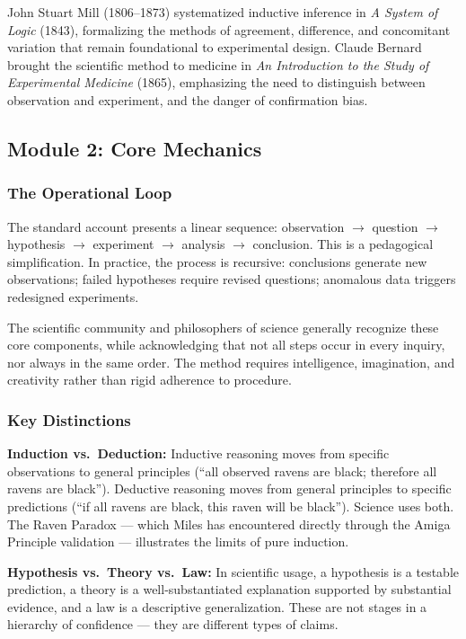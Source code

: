 \documentclass[11pt,letterpaper]{article}
\begin{document}
John Stuart Mill (1806--1873) systematized inductive inference in \emph{A System of Logic} (1843), formalizing the methods of agreement, difference, and concomitant variation that remain foundational to experimental design. Claude Bernard brought the scientific method to medicine in \emph{An Introduction to the Study of Experimental Medicine} (1865), emphasizing the need to distinguish between observation and experiment, and the danger of confirmation bias.

\subsection{Module 2: Core Mechanics}

\subsubsection{The Operational Loop}

The standard account presents a linear sequence: observation $\to$ question $\to$ hypothesis $\to$ experiment $\to$ analysis $\to$ conclusion. This is a pedagogical simplification. In practice, the process is recursive: conclusions generate new observations; failed hypotheses require revised questions; anomalous data triggers redesigned experiments.

The scientific community and philosophers of science generally recognize these core components, while acknowledging that not all steps occur in every inquiry, nor always in the same order. The method requires intelligence, imagination, and creativity rather than rigid adherence to procedure.

\subsubsection{Key Distinctions}

\textbf{Induction vs.\ Deduction:} Inductive reasoning moves from specific observations to general principles (``all observed ravens are black; therefore all ravens are black''). Deductive reasoning moves from general principles to specific predictions (``if all ravens are black, this raven will be black''). Science uses both. The Raven Paradox --- which Miles has encountered directly through the Amiga Principle validation --- illustrates the limits of pure induction.

\textbf{Hypothesis vs.\ Theory vs.\ Law:} In scientific usage, a hypothesis is a testable prediction, a theory is a well-substantiated explanation supported by substantial evidence, and a law is a descriptive generalization. These are not stages in a hierarchy of confidence --- they are different types of claims.
\end{document}
